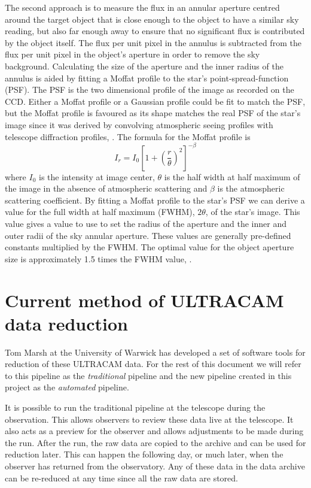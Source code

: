 The second approach is to measure the flux in an annular aperture centred around the target object that is close enough to the object to have a similar sky reading, but also far enough away to ensure that no significant flux is contributed by the object itself. The flux per unit pixel in the annulus is subtracted from the flux per unit pixel in the object's aperture in order to remove the sky background. Calculating the size of the aperture and the inner radius of the annulus is aided by fitting a Moffat profile to the star's point-spread-function (PSF). The PSF is the two dimensional profile of the image as recorded on the CCD.  Either a Moffat profile or a Gaussian profile could be fit to match the PSF, but the Moffat profile is favoured as its shape matches the real PSF of the star's image since it was derived by convolving atmospheric seeing profiles with telescope diffraction profiles, \citep{Moffat69}. The formula for the Moffat profile is \begin{equation} I_r = I_0 {[1 + {(\frac{r}{\theta})}^2]}^{-\beta}\end{equation} where $I_0$ is the intensity at image center, $\theta$ is the half width at half maximum of the image in the absence of atmospheric scattering and $\beta$ is the atmospheric scattering coefficient. By fitting a Moffat profile to the star's PSF we can derive a value for the full width at half maximum (FWHM),  $2\theta$, of the star's image. This value gives a value to use to set the radius of the aperture and the inner and outer radii of the sky annular aperture. These values are generally pre-defined constants multiplied by the FWHM. The optimal value for the object aperture size is approximately 1.5 times the FWHM value, \citep{optimalapertures}.

\section{Current method of ULTRACAM data reduction}
Tom Marsh at the University of Warwick has developed a set of software tools for reduction of these ULTRACAM data. For the rest of this document we will refer to this pipeline as the \emph{traditional} pipeline and the new pipeline created in this project as the \emph{automated} pipeline. 

It is possible to run the traditional pipeline at the telescope during the observation. This allows observers to review these data live at the telescope. It also acts as a preview for the observer and allows adjustments to be made during the run. After the run, the raw data are copied to the archive and can be used for reduction later. This can happen the following day, or much later, when the observer has returned from the observatory. Any of these data in the data archive can be re-reduced at any time since all the raw data are stored. 

